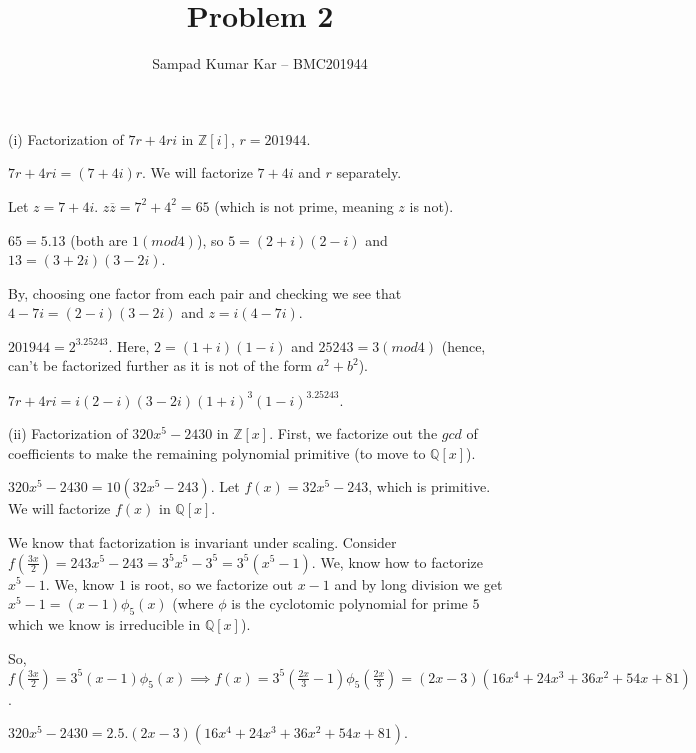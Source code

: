 \documentclass[12pt,a4paper]{article}
\title{Problem 2}
\author{Sampad Kumar Kar -- BMC201944}
\theoremstyle{definition}
\begin{document}
\maketitle

\begin{flushleft}

(i) Factorization of $7r + 4ri$ in $\mathbb{Z}[i]$, $r = 201944$.

$7r+4ri = (7+4i)r$. We will factorize $7 + 4i$ and $r$ separately.

\medskip

Let $z = 7+4i$. $z\overline{z} = 7^2 + 4^2 = 65$ (which is not prime, meaning $z$ is not).

$65 = 5.13$ (both are $1(mod 4)$), so $5 = (2+i)(2-i)$ and $13 = (3+2i)(3-2i)$.

By, choosing one factor from each pair and checking we see that $4-7i = (2-i)(3-2i)$ and $z = i(4-7i)$.

\medskip

$201944 = 2^3.25243$. Here, $2 = (1+i)(1-i)$ and $25243 = 3(mod4)$ (hence, can't be factorized further as it is not of the form $a^2 + b^2$).

\medskip

$7r+4ri = i(2-i)(3-2i)(1+i)^3 (1-i)^3.25243$.

\bigskip
\bigskip

(ii) Factorization of $320x^5 - 2430$ in $\mathbb{Z}[x]$. First, we factorize out the $gcd$ of coefficients to make the remaining polynomial primitive (to move to $\mathbb{Q}[x]$).

$320x^5 - 2430 = 10(32x^5 - 243)$. Let $f(x) = 32x^5 - 243$, which is primitive. We will factorize $f(x)$ in $\mathbb{Q}[x]$.

\medskip

We know that factorization is invariant under scaling. Consider $f(\frac{3x}{2}) = 243x^5 - 243 = 3^5x^5 - 3^5 = 3^5(x^5 - 1)$. We, know how to factorize $x^5 - 1$. We, know $1$ is root, so we factorize out $x-1$ and by long division we get $x^5-1 = (x-1)\phi_5(x)$ (where $\phi$ is the cyclotomic polynomial for prime $5$ which we know is irreducible in $\mathbb{Q}[x]$).

\medskip

So, $f(\frac{3x}{2}) = 3^5(x-1)\phi_5(x) \implies f(x) = 3^5(\frac{2x}{3}-1)\phi_5(\frac{2x}{3}) = (2x-3)(16x^4 +24x^3 + 36x^2 +54x + 81)$.

\medskip

$320x^5 - 2430 = 2.5.(2x-3)(16x^4 +24x^3 + 36x^2 +54x + 81)$.


\end{flushleft}
\end{document}
